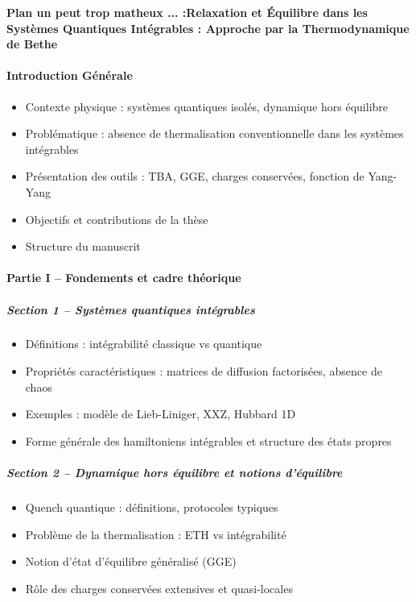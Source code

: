 \textbf{Plan un peut trop matheux ... :Relaxation et Équilibre dans les Systèmes Quantiques Intégrables : Approche par la Thermodynamique de Bethe}

\paragraph{Introduction Générale}
\begin{itemize}
    \item Contexte physique : systèmes quantiques isolés, dynamique hors équilibre
    \item Problématique : absence de thermalisation conventionnelle dans les systèmes intégrables
    \item Présentation des outils : TBA, GGE, charges conservées, fonction de Yang-Yang
    \item Objectifs et contributions de la thèse
    \item Structure du manuscrit
\end{itemize}

\paragraph{Partie I – Fondements et cadre théorique}

\subparagraph{Section 1 – Systèmes quantiques intégrables}
\begin{itemize}
    \item Définitions : intégrabilité classique vs quantique
    \item Propriétés caractéristiques : matrices de diffusion factorisées, absence de chaos
    \item Exemples : modèle de Lieb-Liniger, XXZ, Hubbard 1D
    \item Forme générale des hamiltoniens intégrables et structure des états propres
\end{itemize}

\subparagraph{Section 2 – Dynamique hors équilibre et notions d’équilibre}
\begin{itemize}
    \item Quench quantique : définitions, protocoles typiques
    \item Problème de la thermalisation : ETH vs intégrabilité
    \item Notion d’état d’équilibre généralisé (GGE)
    \item Rôle des charges conservées extensives et quasi-locales
\end{itemize}

